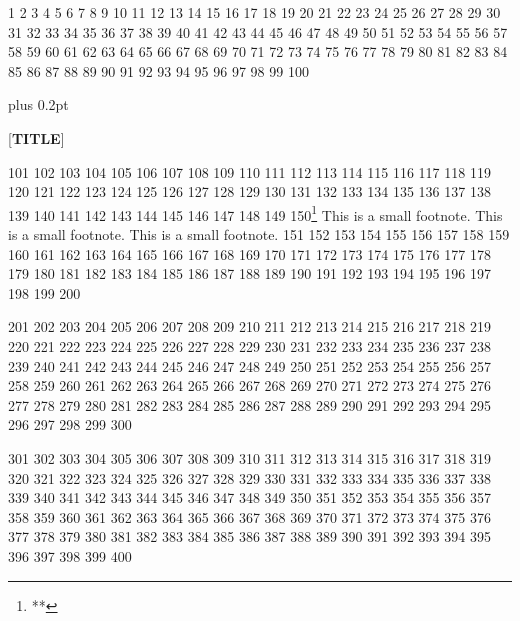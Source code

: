 

1 2 3 4 5 6 7 8 9 10
11 12 13 14 15 16 17 18 19 20
21 22 23 24 25 26 27 28 29 30
31 32 33 34 35 36 37 38 39 40
41 42 43 44 45 46 47 48 49 50
51 52 53 54 55 56 57 58 59 60
61 62 63 64 65 66 67 68 69 70
71 72 73 74 75 76 77 78 79 80
81 82 83 84 85 86 87 88 89 90
91 92 93 94 95 96 97 98 99 100

\columnsep=24pt      %
\columnseprule=0.4pt %
\multicolbaselineskip=0pt plus 0.2pt %

[{{\bf TITLE}}] %

101 102 103 104 105 106 107 108 109 110
111 112 113 114 115 116 117 118 119 120
121 122 123 124 125 126 127 128 129 130
131 132 133 134 135 136 137 138 139 140
141 142 143 144 145 146 147 148 149 150\footnote{**}{%
This is a small footnote.
This is a small footnote.
This is a small footnote.}
151 152 153 154 155 156 157 158 159 160
161 162 163 164 165 166 167 168 169 170
171 172 173 174 175 176 177 178 179 180
181 182 183 184 185 186 187 188 189 190
191 192 193 194 195 196 197 198 199 200

201 202 203 204 205 206 207 208 209 210
211 212 213 214 215 216 217 218 219 220
221 222 223 224 225 226 227 228 229 230
231 232 233 234 235 236 237 238 239 240
241 242 243 244 245 246 247 248 249 250
251 252 253 254 255 256 257 258 259 260
261 262 263 264 265 266 267 268 269 270
271 272 273 274 275 276 277 278 279 280
281 282 283 284 285 286 287 288 289 290
291 292 293 294 295 296 297 298 299 300

301 302 303 304 305 306 307 308 309 310
311 312 313 314 315 316 317 318 319 320
321 322 323 324 325 326 327 328 329 330
331 332 333 334 335 336 337 338 339 340
341 342 343 344 345 346 347 348 349 350
351 352 353 354 355 356 357 358 359 360
361 362 363 364 365 366 367 368 369 370
371 372 373 374 375 376 377 378 379 380
381 382 383 384 385 386 387 388 389 390
391 392 393 394 395 396 397 398 399 400

